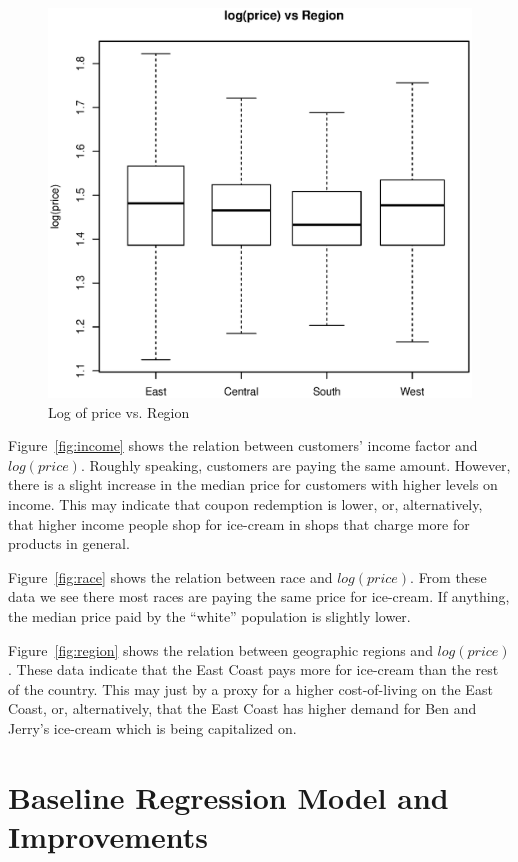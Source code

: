 \documentclass[11pt, fleqn]{article}
\begin{document}
\begin{figure}[!htb]
  \centering
  \includegraphics[scale=.5]{region.eps}
  \caption{Log of price vs. Region}
  \label{fig:region}
\end{figure}

Figure~\vref{fig:income} shows the relation between customers' income factor and $log(price)$.  Roughly speaking, customers are paying the same amount.  However, there is a slight increase in the median price for customers with higher levels on income.  This may indicate that coupon redemption is lower, or, alternatively, that higher income people shop for ice-cream in shops that charge more for products in general.

Figure~\vref{fig:race} shows the relation between race and $log(price)$.  From these data we see there most races are paying the same price for ice-cream.  If anything, the median price paid by the ``white'' population is slightly lower.

Figure~\vref{fig:region} shows the relation between geographic regions and $log(price)$.  These data indicate that the East Coast pays more for ice-cream than the rest of the country.  This may just by a proxy for a higher cost-of-living on the East Coast, or, alternatively, that the East Coast has higher demand for Ben and Jerry's ice-cream which is being capitalized on.

\section{Baseline Regression Model and Improvements}
\end{document}
